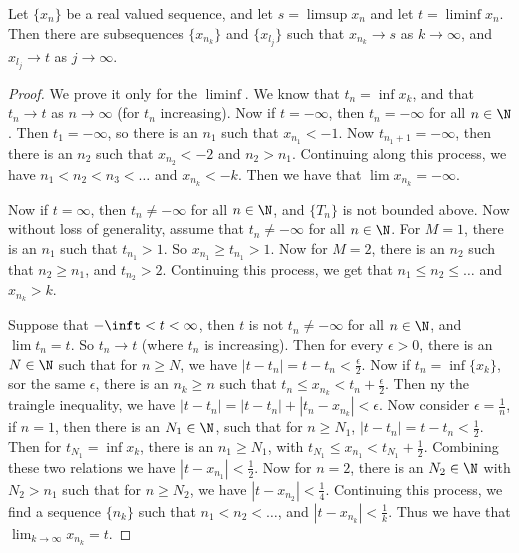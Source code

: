 \begin{theorem}\label{2.5.1}
    Let $\{x_n\}$ be a real valued sequence, and let  $s=\limsup{x_n}$ and let 
    $t=\liminf{x_n}$. Then there are subsequences  $\{x_{n_k}\}$ and  
    $\{x_{l_j}\}$ such that  $x_{n_k} \rightarrow s$ as $k \rightarrow \infty$, 
    and $x_{l_j} \rightarrow t$ as $j \rightarrow \infty$.
\end{theorem}
\begin{proof}
    We prove it only for the $\liminf$. We know that $t_n=\inf{x_k}$, and that 
    $t_n \rightarrow t$ as  $n \rightarrow \infty$  (for $t_n$ increasing). Now 
    if $t=-\infty$, then $t_n=-\infty$ for all  $n \in \N$. Then $ t_1=-\infty$, 
    so there is an $n_1$ such that $x_{n_1}<-1$. Now $t_{n_1+1}=-\infty$, then 
    there is an $n_2$ such that $x_{n_2}<-2$ and $n_2>n_1$. Continuing along this 
    process, we have $n_1<n_2<n_3< \dots$ and $x_{n_k}<-k$. Then we have that 
    $\lim{x_{n_k}}=-\infty$.

    Now if $t=\infty$, then  $t_n \neq -\infty$ for all  $n \in \N$, and  $\{T_n\}$ 
    is not bounded above. Now without loss of generality, assume that $t_n \neq -\infty$ 
    for all $n \in \N$. For $M=1$, there is an  $n_1$ such that $t_{n_1}>1$. 
    So $x_{n_1} \geq t_{n_1}>1$. Now for $M=2$, there is an  $n_2$ such that 
    $n_2 \geq n_1$, and $t_{n_2}>2$. Continuing this process, we get that 
    $n_1 \leq n_2\leq \dots$ and $x_{n_k}>k$.  


    Suppose that $-\inft<t<\infty$, then  $t$ is not  $t_n \neq -\infty$ for all  $n \in \N$, 
    and  $\lim{t_n}=t$. So  $t_n \rightarrow t$  (where $t_n$ is increasing). Then 
    for every $\epsilon>0$, there is an  $N \in \N$ such that for  $n \geq N$, we have 
    $|t-t_n|=t-t_n<\frac{\epsilon}{2}$. Now if $t_n=\inf\{x_k\}$, sor the same  $\epsilon$,
    there is an  $n_k \geq n$ such that  $t_n \leq x_{n_k}<t_n+\frac{\epsilon}{2}$. 
    Then ny the traingle inequality, we have $|t-t_n|=|t-t_n|+|t_n-x_{n_k}|<\epsilon$.
    Now consider  $\epsilon=\frac{1}{n}$, if $n=1$, then there is an  $N_1 \in \N$, 
    such that for  $n \geq N_1$, $|t-t_n|=t-t_n<\frac{1}{2}$. Then for 
    $t_{N_1}=\inf{x_k}$, there is an $n_1 \geq N_1$, with $t_{N_1} \leq x_{n_1} <
    t_{N_1}+\frac{1}{2}$. Combining these two relations we have $|t-x_{n_1}|<\frac{1}{2}$.
    Now for $n=2$, there is an  $N_2 \in \N$ with $N_2>n_1$ such that for $n\geq N_2$, 
    we have $|t-x_{n_2}|<\frac{1}{4}$. Continuing this process, we find a sequence 
    $\{n_k\}$ such that  $n_1<n_2< \dots$, and $|t-x_{n_k}|<\frac{1}{k}$. Thus 
    we have that $\lim_{k \rightarrow \infty}{x_{n_k}}=t$.
\end{proof}


